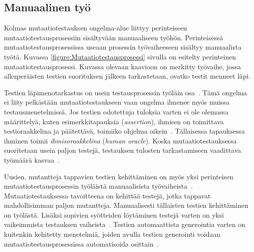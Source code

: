 \documentclass[finnish, grading]{tktltiki2}
\theoremstyle{definition}
\theoremstyle{remark}
\begin{document}
\subsection{Manuaalinen työ}

Kolmas mutaatiotestauksen ongelma-alue liittyy perinteiseen mutaatiotestausprosessiin sisältyvään manuaaliseen työhön. Perinteisessä mutaatiotestausprosessissa useaan prosessin työvaiheeseen sisältyy manuaalista työtä. Kuvassa \ref{figure:Mutaatiotestausprosessi} sivulla \pageref{figure:Mutaatiotestausprosessi} on esitelty perinteinen mutaatiotestausprosessi. Kuvassa olevaan kaavioon on merkitty työvaihe, jossa alkuperäisten testien suorituksen jälkeen tarkastetaan, ovatko testit menneet läpi. 

Testien läpimenotarkastus on usein testausprosessin työläin osa~\cite[s. 653]{Jia:Harman:2011}. Tämä ongelma ei liity pelkästään mutaatiotestaukseen vaan ongelma ilmenee myös muissa testausmenetelmissä. Jos testien odotettuja tuloksia varten ei ole olemassa määrittelyä, kuten esimerkkitapauksia (\textit{assertion}), ihmisen on toimittava testioraakkelina ja päätettävä, toimiiko ohjelma oikein~\cite[s. 519]{Barr:Harman:McMinn:Shahbaz:Yoo:2015}. Tällaisessa tapauksessa ihminen toimii \textit{ihmisoraakkelina} (\textit{human oracle}). Koska mutaatiotestauksessa suoritetaan usein paljon testejä, testauksen tulosten tarkastamiseen vaadittava työmäärä kasvaa~\cite[s. 653]{Jia:Harman:2011}.

Uusien, mutantteja tappavien testien kehittäminen on myös yksi perinteisen mutaatiotestausprosessin työläistä manuaalisista työvaiheista~\cite[s. 39]{Offutt:Untch:2001}. Mutaatiotestauksessa tavoitteena on kehittää testejä, jotka tappavat mahdollisimman paljon mutantteja. Manuaalisesti tällaisten testien kehittäminen on työlästä. Lisäksi sopivien syötteiden löytäminen testejä varten on yksi vaikeimmista testauksen vaiheista~\cite[s. 39]{Offutt:Untch:2001}. Testien automaattista generointia varten on kuitenkin kehitetty menetelmiä, joiden avulla testien generointi voidaan mutaatiotestausprosessissa automatisoida osittain~\cite[s. 39]{Offutt:Untch:2001}.




\end{document}
